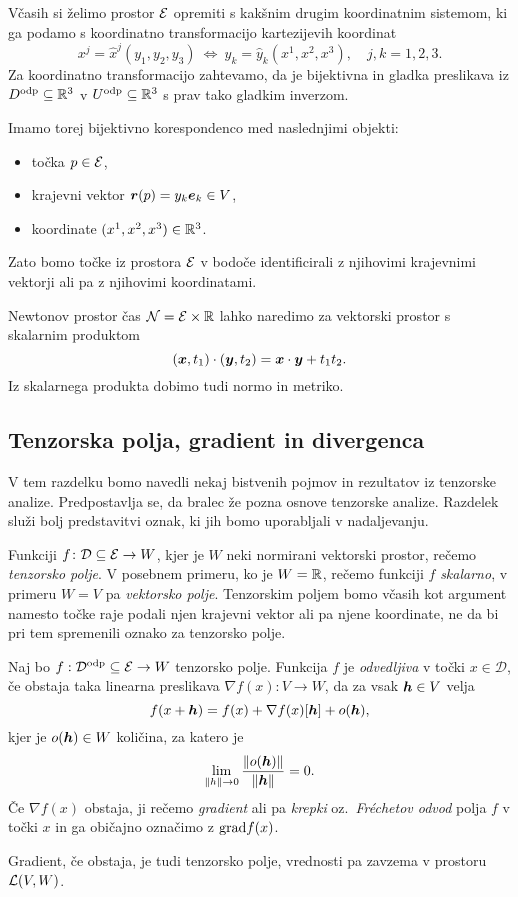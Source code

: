 Včasih si želimo prostor $\mathcal E$ opremiti s kakšnim drugim koordinatnim sistemom, ki ga podamo
s koordinatno transformacijo kartezijevih koordinat
\begin{equation}\label{e:kt}
	x^j = \hat{x}^j(y_1,y_2,y_3) \ \Leftrightarrow \ y_k=\hat{y}_k(x^1,x^2,x^3), \quad j,k=1,2,3.
\end{equation}
Za koordinatno transformacijo zahtevamo, da je bijektivna in gladka preslikava iz
$D^{\mathrm{odp}}\subseteq\mathbb R^3$ v $U^{\mathrm{odp}}\subseteq\mathbb R^3$ s prav tako gladkim inverzom.

Imamo torej bijektivno korespondenco med naslednjimi objekti:
\begin{itemize}
	\item točka $p\in\mathcal E$,
	\item krajevni vektor $\boldsymbol r(p)=y_k\boldsymbol e_k\in V$,
	\item koordinate $(x^1,x^2,x^3)\in\mathbb R^3$.
\end{itemize}
Zato bomo točke iz prostora $\mathcal E$ v bodoče identificirali z njihovimi krajevnimi vektorji ali pa z njihovimi koordinatami.

Newtonov prostor čas $\mathcal{N}=\mathcal E\times\mathbb R$ lahko naredimo za vektorski prostor s skalarnim produktom
\[ (\boldsymbol x,t_1)\cdot(\boldsymbol y,t_2) = \boldsymbol x\cdot\boldsymbol y + t_1 t_2. \]
Iz skalarnega produkta dobimo tudi normo in metriko.


\subsection{Tenzorska polja, gradient in divergenca}


V tem razdelku bomo navedli nekaj bistvenih pojmov in rezultatov iz tenzorske analize. Predpostavlja
se, da bralec že pozna osnove tenzorske analize. Razdelek služi bolj predstavitvi oznak, ki jih
bomo uporabljali v nadaljevanju.

Funkciji $f\colon\mathcal{D}\subseteq\mathcal E\to W$, kjer je $W$ neki normirani vektorski prostor, rečemo
\emph{tenzorsko polje}. V posebnem primeru, ko je $W=\mathbb R$, rečemo funkciji $f$ \emph{skalarno},
v primeru $W=V$ pa \emph{vektorsko polje}. Tenzorskim poljem bomo včasih kot argument namesto točke raje
podali njen krajevni vektor ali pa njene koordinate, ne da bi pri tem spremenili oznako za tenzorsko polje.

\begin{definicija}
	Naj bo $f:\mathcal{D}^{\mathrm{odp}}\subseteq\mathcal E\to W$ tenzorsko polje. Funkcija $f$ je \emph{odvedljiva}
	v točki $x\in\mathcal{D}$, če obstaja taka linearna preslikava $\nabla f(x):V\to W$, da za vsak $\boldsymbol h\in V$ velja
	\begin{equation*}
		f(x+\boldsymbol h)=f(x)+\nabla f(x)[\boldsymbol h]+o(\boldsymbol h),
	\end{equation*}
	kjer je $o(\boldsymbol h)\in W$ količina, za katero je
	\[ \lim_{\| h\|\to 0}\frac{\|o(\boldsymbol h)\|}{\|\boldsymbol h\|}=0. \]
	Če $\nabla f(x)$ obstaja, ji rečemo \emph{gradient} ali pa \emph{krepki} oz.~\emph{Fréchetov odvod} polja $f$ v točki $x$
	in ga običajno označimo z $\mathrm{grad} f(x)$.
\end{definicija}
Gradient, če obstaja, je tudi tenzorsko polje, vrednosti pa zavzema v prostoru $\mathcal L(V,W)$.

